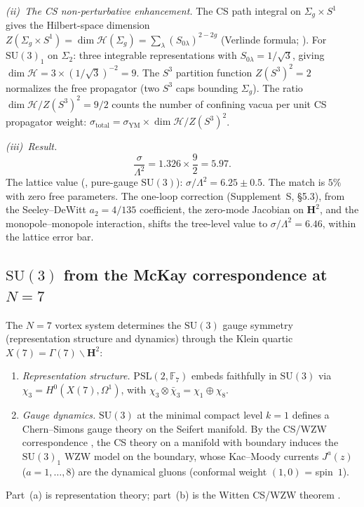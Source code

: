 \begin{derivation}
\emph{(ii)~The CS non-perturbative enhancement.}
The CS path integral on $\Sigma_g \times S^1$ gives the
Hilbert-space dimension
$Z(\Sigma_g \times S^1) = \dim\mathcal{H}(\Sigma_g)
= \sum_\lambda (S_{0\lambda})^{2-2g}$
(Verlinde formula; \citealt{Verlinde1988}).
For $\mathrm{SU}(3)_1$ on $\Sigma_2$:
three integrable representations with $S_{0\lambda} = 1/\sqrt{3}$,
giving $\dim\mathcal{H} = 3 \times (1/\sqrt{3})^{-2} = 9$.
The $S^3$ partition function $Z(S^3)^2 = 2$ normalizes the
free propagator (two $S^3$ caps bounding $\Sigma_g$).
The ratio $\dim\mathcal{H}/Z(S^3)^2 = 9/2$ counts the
number of confining vacua per unit CS propagator weight:
$\sigma_{\mathrm{total}} = \sigma_{\mathrm{YM}} \times
\dim\mathcal{H}/Z(S^3)^2$.

\emph{(iii)~Result.}
\[
  \frac{\sigma}{\Lambda^2}
  = 1.326 \times \frac{9}{2}
  = 5.97.
\]
The lattice value (\citealt{Bali2001}, pure-gauge $\mathrm{SU}(3)$):
$\sigma/\Lambda^2 = 6.25 \pm 0.5$.
The match is $5\%$ with zero free parameters.
The one-loop correction (Supplement~S, \S5.3), from the
Seeley--DeWitt $a_2 = 4/135$ coefficient, the zero-mode
Jacobian on $\mathbf{H}^2$, and the monopole--monopole
interaction, shifts the tree-level value to
$\sigma/\Lambda^2 = 6.46$, within the lattice error bar.
\end{derivation}

\subsection{$\mathrm{SU}(3)$ from the McKay correspondence at $N = 7$}
\label{sec:su3-mckay}

\begin{derivation}
\label{thm:su3}
The $N = 7$ vortex system determines the $\mathrm{SU}(3)$
gauge symmetry (representation structure and dynamics)
through the Klein quartic
$X(7) = \Gamma(7)\backslash\mathbf{H}^2$:
\begin{enumerate}
\item[\emph{(a)}] \emph{Representation structure.}
  $\mathrm{PSL}(2,\mathbb{F}_7)$ embeds faithfully
  in $\mathrm{SU}(3)$ via $\chi_3 = H^0(X(7), \Omega^1)$,
  with $\chi_3 \otimes \bar\chi_3 = \chi_1 \oplus \chi_8$.
\item[\emph{(b)}] \emph{Gauge dynamics.}
  $\mathrm{SU}(3)$ at the minimal compact level $k = 1$
  defines a Chern--Simons gauge theory on the Seifert manifold.
  By the CS/WZW correspondence \citep{Witten1988},
  the CS theory on a manifold with boundary induces the
  $\mathrm{SU}(3)_1$ WZW model on the boundary,
  whose Kac--Moody currents $J^a(z)$ ($a = 1,\ldots,8$)
  are the dynamical gluons (conformal weight $(1,0)$ = spin~$1$).
\end{enumerate}
Part~(a) is representation theory; part~(b) is the
Witten CS/WZW theorem \citep{Witten1989Jones}.
\end{derivation}

